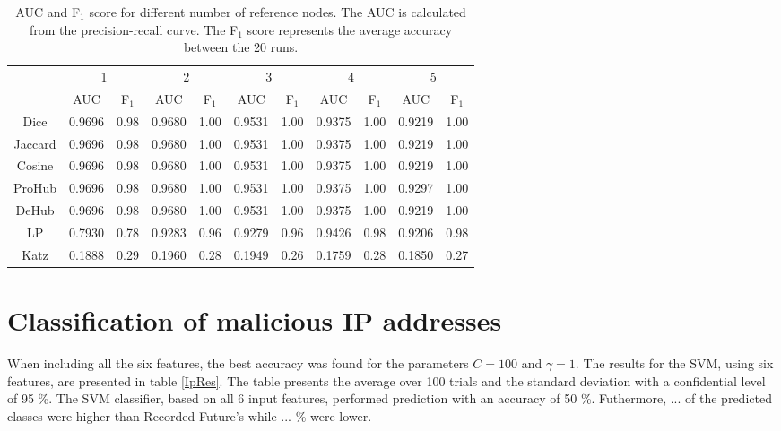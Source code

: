\begin{table}[h!]
    \centering
    \caption{AUC and F$_1$ score for different number of reference nodes. The AUC is calculated from the precision-recall curve. The F$_1$ score represents the average accuracy between the 20 runs.}
    \begin{tabular}{|c||c|c||c|c||c|c||c|c||c|c||}
      \hline
      \multirow{2}{*}{~} 
            & \multicolumn{2}{c||}{1}
            & \multicolumn{2}{c||}{2}
            & \multicolumn{2}{c||}{3}
            & \multicolumn{2}{c||}{4}
            & \multicolumn{2}{|c|}{5} \\             \cline{2-11}
      ~     &AUC&F$_1$&AUC&F$_1$&AUC&F$_1$&AUC&F$_1$&AUC&F$_1$ \\ \hline
    Dice    & 0.9696 & 0.98 & 0.9680 & 1.00 & 0.9531 & 1.00 & 0.9375 & 1.00 & 0.9219 & 1.00 \\
    Jaccard & 0.9696 & 0.98 & 0.9680 & 1.00 & 0.9531 & 1.00 & 0.9375 & 1.00 & 0.9219 & 1.00 \\
    Cosine  & 0.9696 & 0.98 & 0.9680 & 1.00 & 0.9531 & 1.00 & 0.9375 & 1.00 & 0.9219 & 1.00 \\
    ProHub  & 0.9696 & 0.98 & 0.9680 & 1.00 & 0.9531 & 1.00 & 0.9375 & 1.00 & 0.9297 & 1.00 \\
    DeHub   & 0.9696 & 0.98 & 0.9680 & 1.00 & 0.9531 & 1.00 & 0.9375 & 1.00 & 0.9219 & 1.00 \\ 
    LP      & 0.7930 & 0.78 & 0.9283 & 0.96 & 0.9279 & 0.96 & 0.9426 & 0.98 & 0.9206 & 0.98 \\ 
    Katz    & 0.1888 & 0.29 & 0.1960 & 0.28 & 0.1949 & 0.26 & 0.1759 & 0.28 & 0.1850 & 0.27 \\ \hline
    \end{tabular}
    \label{aucIndex2}
\end{table}



\FloatBarrier
\section{Classification of malicious IP addresses}

When including all the six features, the best accuracy was found for the parameters $C=100$ and $\gamma=1$. The results for the SVM, using six features, are presented in table \ref{IpRes}. The table presents the average over 100 trials and the standard deviation with a confidential level of 95 \%. The SVM classifier, based on all 6 input features, performed prediction with an accuracy of 50 \%. Futhermore, ... of the predicted classes were higher than Recorded Future's while ... \% were lower. 

